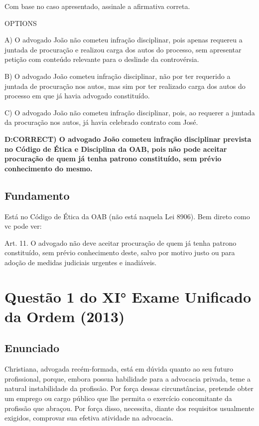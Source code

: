 \documentclass[12pt]{article}
\begin{document}
Com base no caso apresentado, assinale a afirmativa correta. 
 
OPTIONS

A) O advogado João não cometeu infração disciplinar, pois 
apenas requereu a juntada de procuração e realizou carga 
dos autos do processo, sem apresentar petição com 
conteúdo relevante para o deslinde da controvérsia. 

B) O advogado João cometeu infração disciplinar, não por ter 
requerido a juntada de procuração nos autos, mas sim por 
ter realizado carga dos autos do processo em que já havia 
advogado constituído. 

C) O advogado João não cometeu infração disciplinar, pois, ao 
requerer a juntada da procuração nos autos, já havia 
celebrado contrato com José. 

\textbf{D:CORRECT) O advogado João cometeu infração disciplinar prevista no Código de Ética e Disciplina da OAB, pois não pode aceitar 
procuração de quem já tenha patrono constituído, sem 
prévio conhecimento do mesmo.}

\subsection{Fundamento}

Está no Código de Ética da OAB (não está naquela Lei 8906). Bem direto como vc pode ver:

Art. 11. O   advogado   não   deve   aceitar   procuração   de   quem   já   tenha   patrono constituído, sem prévio conhecimento deste, salvo por motivo justo ou para adoção de medidas judiciais urgentes e inadiáveis.  

\section{Questão 1 do XI° Exame Unificado da Ordem (2013)}

\subsection{Enunciado}

Christiana, advogada recém-formada, está em dúvida quanto 
ao seu futuro profissional, porque, embora possua habilidade 
para a advocacia privada, teme a natural instabilidade da 
profissão. Por força dessas circunstâncias, pretende obter um 
emprego ou cargo público que lhe permita o exercício 
concomitante da profissão que abraçou. Por força disso, 
necessita, diante dos requisitos usualmente exigidos, 
comprovar sua efetiva atividade na advocacia.  
 
\end{document}

